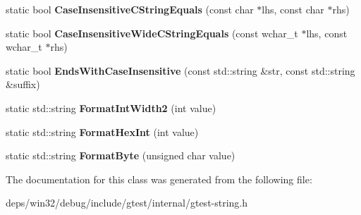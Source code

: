 \begin{DoxyCompactItemize}
\item 
\hypertarget{classtesting_1_1internal_1_1_string_a7ce24c41c67b928fe89434d3571c988c}{}static bool {\bfseries Case\+Insensitive\+C\+String\+Equals} (const char $\ast$lhs, const char $\ast$rhs)\label{classtesting_1_1internal_1_1_string_a7ce24c41c67b928fe89434d3571c988c}

\item 
\hypertarget{classtesting_1_1internal_1_1_string_a0a67eac434fa7800640c9d56cb91e105}{}static bool {\bfseries Case\+Insensitive\+Wide\+C\+String\+Equals} (const wchar\+\_\+t $\ast$lhs, const wchar\+\_\+t $\ast$rhs)\label{classtesting_1_1internal_1_1_string_a0a67eac434fa7800640c9d56cb91e105}

\item 
\hypertarget{classtesting_1_1internal_1_1_string_a3de1df085eddc89ef3f3833c67aee3fe}{}static bool {\bfseries Ends\+With\+Case\+Insensitive} (const std\+::string \&str, const std\+::string \&suffix)\label{classtesting_1_1internal_1_1_string_a3de1df085eddc89ef3f3833c67aee3fe}

\item 
\hypertarget{classtesting_1_1internal_1_1_string_a51cab855f7ec6091e5886b6be5598ca2}{}static std\+::string {\bfseries Format\+Int\+Width2} (int value)\label{classtesting_1_1internal_1_1_string_a51cab855f7ec6091e5886b6be5598ca2}

\item 
\hypertarget{classtesting_1_1internal_1_1_string_a7bedf4780e0c938d203b73ddb17ff490}{}static std\+::string {\bfseries Format\+Hex\+Int} (int value)\label{classtesting_1_1internal_1_1_string_a7bedf4780e0c938d203b73ddb17ff490}

\item 
\hypertarget{classtesting_1_1internal_1_1_string_ab3555eeb6abe4b7c6f63d865af10379d}{}static std\+::string {\bfseries Format\+Byte} (unsigned char value)\label{classtesting_1_1internal_1_1_string_ab3555eeb6abe4b7c6f63d865af10379d}

\end{DoxyCompactItemize}


The documentation for this class was generated from the following file\+:\begin{DoxyCompactItemize}
\item 
deps/win32/debug/include/gtest/internal/gtest-\/string.\+h\end{DoxyCompactItemize}
